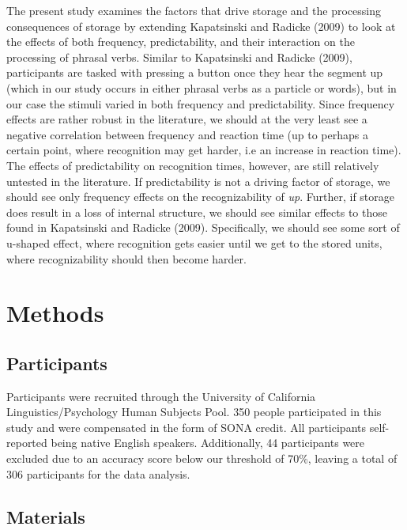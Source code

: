 \documentclass[
  man,floatsintext]{apa6}
\begin{document}
The present study examines the factors that drive storage and the processing consequences of storage by extending Kapatsinski and Radicke (2009) to look at the effects of both frequency, predictability, and their interaction on the processing of phrasal verbs. Similar to Kapatsinski and Radicke (2009), participants are tasked with pressing a button once they hear the segment up (which in our study occurs in either phrasal verbs as a particle or words), but in our case the stimuli varied in both frequency and predictability. Since frequency effects are rather robust in the literature, we should at the very least see a negative correlation between frequency and reaction time (up to perhaps a certain point, where recognition may get harder, i.e an increase in reaction time). The effects of predictability on recognition times, however, are still relatively untested in the literature. If predictability is not a driving factor of storage, we should see only frequency effects on the recognizability of \emph{up}. Further, if storage does result in a loss of internal structure, we should see similar effects to those found in Kapatsinski and Radicke (2009). Specifically, we should see some sort of u-shaped effect, where recognition gets easier until we get to the stored units, where recognizability should then become harder.

\hypertarget{methods}{%
\section{Methods}\label{methods}}

\hypertarget{participants}{%
\subsection{Participants}\label{participants}}

Participants were recruited through the University of California Linguistics/Psychology Human Subjects Pool. 350 people participated in this study and were compensated in the form of SONA credit. All participants self-reported being native English speakers. Additionally, 44 participants were excluded due to an accuracy score below our threshold of 70\%, leaving a total of 306 participants for the data analysis.

\hypertarget{materials}{%
\subsection{Materials}\label{materials}}
\end{document}
